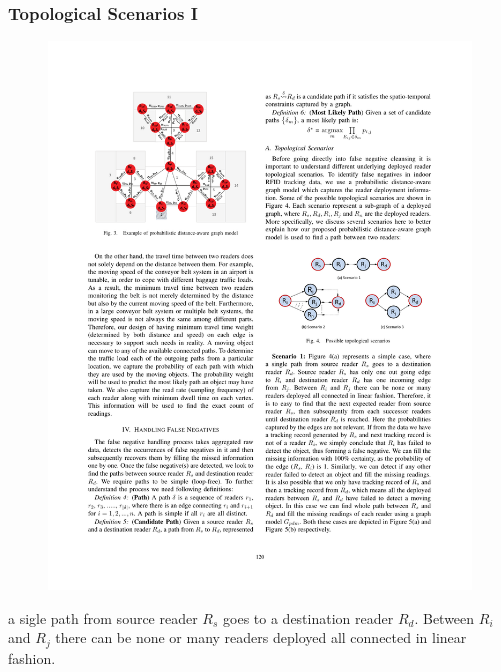 \begin{frame}
\frametitle{Topological Scenarios I}

\begin{figure}[tb]
  \includegraphics[width=0.8\columnwidth]{figures/3-3/3-3-4.pdf}
\end{figure}

a sigle path from source reader $R_s$ goes to a destination reader $R_d$. Between $R_i$ and $R_j$ there can be none or many readers deployed all connected in linear fashion.

\end{frame}


